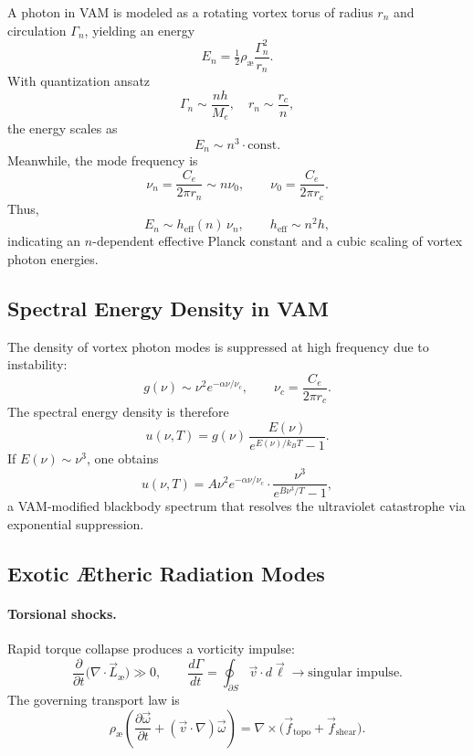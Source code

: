 \documentclass[11pt]{article}
\begin{document}
    A photon in VAM is modeled as a rotating vortex torus of radius $r_n$
    and circulation $\Gamma_n$, yielding an energy
    \[
        E_n = \tfrac{1}{2} \rho_\text{\ae} \frac{\Gamma_n^2}{r_n}.
    \]
    With quantization ansatz
    \[
        \Gamma_n \sim \frac{n h}{M_e}, \quad r_n \sim \frac{r_c}{n},
    \]
    the energy scales as
    \[
        E_n \sim n^3 \cdot \text{const}.
    \]
    Meanwhile, the mode frequency is
    \[
        \nu_n = \frac{C_e}{2\pi r_n} \sim n \nu_0,
        \qquad \nu_0 = \frac{C_e}{2\pi r_c}.
    \]
    Thus,
    \[
        E_n \sim h_{\text{eff}}(n)\, \nu_n,
        \qquad h_{\text{eff}} \sim n^2 h,
    \]
    indicating an $n$-dependent effective Planck constant
    and a cubic scaling of vortex photon energies.

    \subsection{Spectral Energy Density in VAM}

    The density of vortex photon modes is suppressed at high frequency due to
    instability:
    \[
        g(\nu) \sim \nu^2 e^{-\alpha \nu/\nu_c}, \qquad
        \nu_c = \frac{C_e}{2\pi r_c}.
    \]
    The spectral energy density is therefore
    \[
        u(\nu, T) = g(\nu)\,\frac{E(\nu)}{e^{E(\nu)/k_B T} - 1}.
    \]
    If $E(\nu) \sim \nu^3$, one obtains
    \[
        u(\nu, T) =
        A \nu^2 e^{-\alpha \nu/\nu_c} \cdot
        \frac{\nu^3}{e^{B \nu^3/T} - 1},
    \]
    a VAM-modified blackbody spectrum that resolves the ultraviolet catastrophe
    via exponential suppression.

    \subsection{Exotic Ætheric Radiation Modes}

    \paragraph{Torsional shocks.}
    Rapid torque collapse produces a vorticity impulse:
    \[
        \frac{\partial}{\partial t} \big( \nabla \cdot \vec{L}_\text{\ae} \big) \gg 0,
        \qquad
        \frac{d\Gamma}{dt} = \oint_{\partial S} \vec{v}\cdot d\vec{\ell}
        \to \text{singular impulse}.
    \]
    The governing transport law is
    \[
        \rho_\text{\ae}\!\left(
                             \frac{\partial \vec{\omega}}{\partial t}
                             + (\vec{v}\cdot \nabla)\vec{\omega}
        \right) = \nabla \times
        \big( \vec{f}_{\text{topo}} + \vec{f}_{\text{shear}} \big).
    \]
\end{document}
